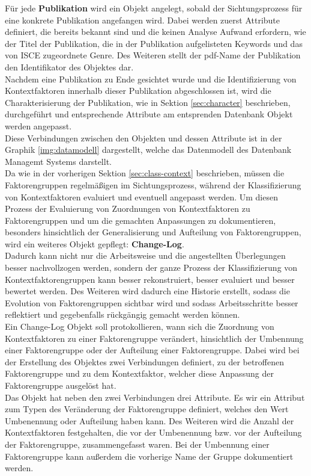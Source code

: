 Für jede \textbf{Publikation} wird ein Objekt angelegt, sobald der Sichtungsprozess für eine konkrete Publikation angefangen wird. Dabei werden zuerst Attribute definiert, die bereits bekannt sind und die keinen Analyse Aufwand erfordern, wie der Titel der Publikation, die in der Publikation aufgelisteten Keywords und das von ISCE zugeordnete Genre. Des Weiteren stellt der pdf-Name der Publikation den Identifikator des Objektes dar. \\ %
Nachdem eine Publikation zu Ende gesichtet wurde und die Identifizierung von Kontextfaktoren innerhalb dieser Publikation abgeschlossen ist, wird die Charakterisierung der Publikation, wie in Sektion \ref{sec:character} beschrieben, durchgeführt und entsprechende Attribute am entsprenden Datenbank Objekt werden angepasst. \\

Diese Verbindungen zwischen den Objekten und dessen Attribute ist in der Graphik \ref{img:datamodell} dargestellt, welche das Datenmodell des Datenbank Managemt Systems darstellt. \\

Da wie in der vorherigen Sektion \ref{sec:class-context} beschrieben, müssen die Faktorengruppen regelmäßigen im Sichtungsprozess, während der Klassifizierung von Kontextfaktoren evaluiert und eventuell angepasst werden. Um diesen Prozess der Evaluierung von Zuordnungen von Kontextfaktoren zu Faktorengruppen und um die gemachten Anpassungen zu dokumentieren, besonders hinsichtlich der Generalisierung und Aufteilung von Faktorengruppen, wird ein weiteres Objekt gepflegt: \textbf{Change-Log}. \\
Dadurch kann nicht nur die Arbeitsweise und die angestellten Überlegungen besser nachvollzogen werden, sondern der ganze Prozess der Klassifizierung von Kontextfaktorengruppen kann besser rekonstruiert, besser evaluiert und besser bewertet werden. Des Weiteren wird dadurch eine Historie erstellt, sodass die Evolution von Faktorengruppen sichtbar wird und sodass Arbeitsschritte besser reflektiert und gegebenfalls rückgängig gemacht werden können. \\

Ein Change-Log Objekt soll protokollieren, wann sich die Zuordnung von Kontextfaktoren zu einer Faktorengruppe verändert, hinsichtlich der Umbennung einer Faktorengruppe oder der Aufteilung einer Faktorengruppe. Dabei wird bei der Erstellung des Objektes zwei Verbindungen definiert, zu der betroffenen Faktorengruppe und zu dem Kontextfaktor, welcher diese Anpassung der Faktorengruppe ausgelöst hat. \\
Das Objekt hat neben den zwei Verbindungen drei Attribute. Es wir ein Attribut zum Typen des Veränderung der Faktorengruppe definiert, welches den Wert Umbenennung oder Aufteilung haben kann. Des Weiteren wird die Anzahl der Kontextfaktoren festgehalten, die vor der Umbenennung bzw. vor der Aufteilung der Faktorengruppe, zusammengefasst waren. Bei der Umbennung einer Faktorengruppe kann außerdem die vorherige Name der Gruppe dokumentiert werden. \\
 
